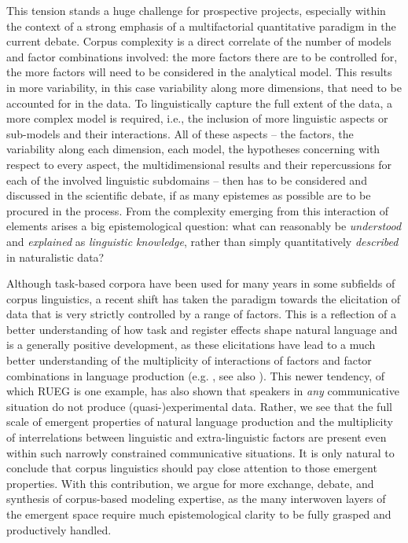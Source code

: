 \documentclass[output=paper,colorlinks,citecolor=brown]{langscibook}
\begin{document}
\begin{sloppypar}
This tension stands a huge challenge for prospective projects, especially within the context of a strong emphasis of a multifactorial quantitative paradigm in the current debate. Corpus complexity is a direct correlate of the number of models and factor combinations involved: the more factors there are to be controlled for, the more factors will need to be considered in the analytical model. This results in more variability, in this case variability along more dimensions, that need to be accounted for in the data. To linguistically capture the full extent of the data, a more complex model is required, i.e., the inclusion of more linguistic aspects or sub-models and their interactions. All of these aspects -- the factors, the variability along each dimension, each model, the hypotheses concerning with respect to every aspect, the multidimensional results  and their repercussions for each of the involved linguistic subdomains -- then has to be considered and discussed in the scientific debate, if as many epistemes as possible are to be procured in the process. From the complexity emerging from this interaction of elements arises a big epistemological question: what can reasonably be \textit{understood} and \textit{explained} as \textit{linguistic knowledge}, rather than simply quantitatively \textit{described} in naturalistic data?
\end{sloppypar}

Although task-based corpora have been used for many years in some subfields of corpus linguistics, a recent shift has taken the paradigm towards the elicitation of data that is very strictly controlled by a range of factors. This is a reflection of a better understanding of how task and register effects shape natural language and is a generally positive development, as these elicitations have lead to a much better understanding of the multiplicity of interactions of factors and factor combinations in language production (e.g. \cite{alexopoulou2017task}, see also ). This newer tendency, of which RUEG is one example, has also shown that speakers in \textit{any} communicative situation do not produce (quasi-)experimental data. Rather, we see that the full scale of  emergent properties of natural language production and the multiplicity of interrelations between linguistic and extra-linguistic factors are present even within such narrowly constrained communicative situations. It is only natural to conclude that corpus linguistics should pay close attention to those emergent properties. With this contribution, we argue for more exchange, debate, and synthesis of corpus-based modeling expertise, as the many interwoven layers of the emergent space require much epistemological clarity to be fully grasped and productively handled.
\end{document}
